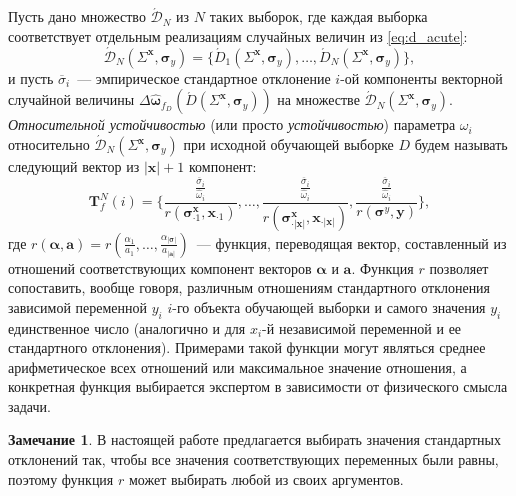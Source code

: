 \documentclass[12pt,a4paper]{article}
\theoremstyle{definition}
\newtheorem{note}{Замечание}
\begin{document}
Пусть дано множество $\acute{\mathcal{D}}_N$ из $N$ таких выборок, где каждая выборка
соответствует отдельным реализациям случайных величин из \eqref{eq:d_acute}:
\[
  \acute{\mathcal{D}}_N (\Sigma^{\mathbf{x}}, \boldsymbol{\sigma}_y) = \{ \acute{D}_1 (\Sigma^{\mathbf{x}}, \boldsymbol{\sigma}_y), \dots, \acute{D}_N (\Sigma^{\mathbf{x}}, \boldsymbol{\sigma}_y) \},
\]
и пусть $\overline{\sigma}_i$~--- эмпирическое стандартное отклонение $i$-ой компоненты
векторной случайной величины
$ \Delta\hat{\boldsymbol{\omega}}_{f_D}(\acute{D} (\Sigma^{\mathbf{x}}, \boldsymbol{\sigma}_y) ) $
на множестве $\acute{\mathcal{D}}_N (\Sigma^{\mathbf{x}}, \boldsymbol{\sigma}_y)$.
\emph{Относительной устойчивостью} (или просто \emph{устойчивостью}) параметра
$\omega_i$ относительно $\acute{\mathcal{D}}_N (\Sigma^{\mathbf{x}}, \boldsymbol{\sigma}_y)$
при исходной обучающей выборке $D$ будем называть следующий вектор
из $| \mathbf{x} | + 1$ компонент:
\begin{equation}
  \mathbf{T}^N_f(i) = \big\{ \frac{\frac{\overline{\sigma}_i}{\hat{\omega}_i}}{r(\boldsymbol{\sigma}^\mathbf{x}_{\cdot 1}, \mathbf{x}_{\cdot 1})}, \dots, \frac{\frac{\overline{\sigma}_i}{\hat{\omega}_i}}{r(\boldsymbol{\sigma}^\mathbf{x}_{\cdot |\mathbf{x}|}, \mathbf{x}_{\cdot |\mathbf{x}|})}, \frac{\frac{\overline{\sigma}_i}{\hat{\omega}_i}}{r(\boldsymbol{\sigma}^y, \mathbf{y})} \big\},
  \label{eq:t_rel}
\end{equation}
где $r(\boldsymbol{\alpha}, \mathbf{a}) = r(\frac{\alpha_1}{a_1}, \dots, \frac{\alpha_{|\boldsymbol{\sigma}|}}{a_{|\mathbf{a}|}})$~---
функция, переводящая вектор, составленный из отношений соответствующих компонент векторов $\boldsymbol{\alpha}$ и $\mathbf{a}$.
Функция $r$ позволяет сопоставить, вообще говоря, различным отношениям стандартного
отклонения зависимой переменной $y_i$ $i$-го объекта обучающей выборки и самого значения $y_i$
единственное число (аналогично и для $x_i$-й независимой переменной и ее стандартного отклонения).
Примерами такой функции могут являться среднее арифметическое
всех отношений или максимальное значение отношения, а конкретная функция выбирается
экспертом в зависимости от физического смысла задачи.

\begin{note}
В настоящей работе предлагается выбирать значения стандартных отклонений так, чтобы
все значения соответствующих переменных были равны, поэтому функция $r$ может выбирать
любой из своих аргументов.
\label{note:r_equality}
\end{note}
\end{document}
